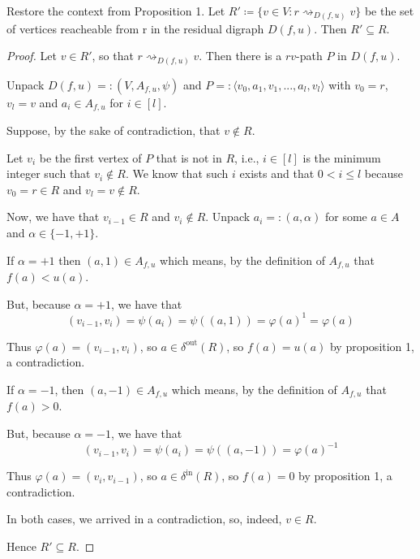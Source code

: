 \documentclass[a4paper,10pt, leqno]{article}
\theoremstyle{definition}
\begin{document}
\begin{proposition}
    Restore the context from Proposition 1. Let $R' \coloneqq \{v \in V : r \rightsquigarrow_{D(f, u)} v \}$ be the set of vertices reacheable from r in the residual digraph $D(f, u)$. Then $R' \subseteq R$.     
\end{proposition}
\begin{proof}
    Let $v \in R'$, so that $r \rightsquigarrow_{D(f, u)} v$. Then there is a $rv$-path $P$ in $D(f,u)$. 
    
    Unpack $D(f,u) =: (V, A_{f, u}, \psi)$ and $P =: \langle v_0, a_1, v_1, ..., a_l, v_l\rangle$ with $v_0 = r$, $v_l = v$ and $a_i \in A_{f, u}$ for $i \in [l]$.
    
    Suppose, by the sake of contradiction, that $v \notin R$.
    
    Let $v_i$ be the first vertex of $P$ that is not in $R$, i.e., $i \in [l]$ is the minimum integer such that $v_i \notin R$.
    We know that such $i$ exists and that $0 < i \leq l$ because $v_0 = r \in R$ and $v_l = v \notin R$.
    
    Now, we have that $v_{i-1} \in R$ and $v_i \notin R$.
    Unpack $a_i =: (a, \alpha)$ for some $a \in A$ and $\alpha \in \{-1, +1\}$. 
    
    If $\alpha = +1$ then $(a, 1) \in A_{f,u}$ which means, by the definition of $A_{f, u}$ that $f(a) < u(a)$. 
    
    But, because $\alpha = +1$, we have that 
    \begin{equation*}
     (v_{i-1}, v_i) = \psi(a_i) = \psi((a, 1)) = \varphi(a)^1 = \varphi(a)
    \end{equation*}

    Thus $\varphi(a) = (v_{i-1}, v_i)$, so $ a \in \delta^{\text{out}}(R)$, so $f(a) = u(a)$ by proposition 1, a contradiction.
    
    If $\alpha = -1$, then $(a, -1) \in A_{f,u}$ which means, by the definition of $A_{f, u}$ that $f(a) > 0$.
    
    But, because $\alpha = -1$, we have that 
    \begin{equation*}
     (v_{i-1}, v_i) = \psi(a_i) = \psi((a, -1)) = \varphi(a)^{-1}
    \end{equation*}

    Thus $\varphi(a) = (v_i, v_{i-1})$, so $ a \in \delta^{\text{in}}(R)$, so $f(a) = 0$ by proposition 1, a contradiction.
    
    In both cases, we arrived in a contradiction, so, indeed, $v \in R$.
    
    Hence $R' \subseteq R$.
    
\end{proof}
\end{document}
